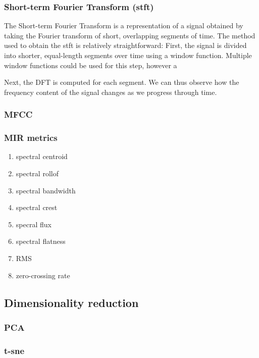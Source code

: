 \documentclass[11pt]{article}
\begin{document}
\subsubsection{Short-term Fourier Transform (stft)}
\label{sec:org5ad94c1}
The Short-term Fourier Transform is a representation of a signal obtained by taking the Fourier transform of short, overlapping segments of time. The method used to obtain the stft is relatively straightforward:
First, the signal is divided into shorter, equal-length segments over time using a window function. Multiple window functions could be used for this step, however a

Next, the DFT is computed for each segment. We can thus observe how the frequency content of the signal changes as we progress through time.
\subsubsection{MFCC}
\label{sec:org657745a}
\subsubsection{MIR metrics}
\label{sec:org59595af}
\begin{enumerate}
\item spectral centroid
\label{sec:org722ed3e}
\item spectral rollof
\label{sec:org8ba1512}
\item spectral bandwidth
\label{sec:org9dcacf6}
\item spectral crest
\label{sec:org25d762a}
\item specral flux
\label{sec:org8d3ce71}
\item spectral flatness
\label{sec:org06c8a6d}
\item RMS
\label{sec:orgb1f5108}
\item zero-crossing rate
\label{sec:org7b27629}
\end{enumerate}
\subsection{Dimensionality reduction}
\label{sec:orgb502774}
\subsubsection{PCA}
\label{sec:org93f3c9b}
\subsubsection{t-sne}
\label{sec:orgadaa38f}
\end{document}
